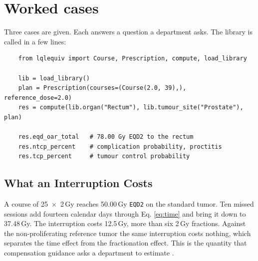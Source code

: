 \documentclass[preprint,12pt,number]{elsarticle}
\begin{document}
\section{Worked cases} \label{sec:examples}
Three cases are given. Each answers a question a department asks. The library is called in a few lines:
    \begin{verbatim}
    from lqlequiv import Course, Prescription, compute, load_library

    lib = load_library()
    plan = Prescription(courses=(Course(2.0, 39),), reference_dose=2.0)
    res = compute(lib.organ("Rectum"), lib.tumour_site("Prostate"), plan)

    res.eqd_oar_total   # 78.00 Gy EQD2 to the rectum
    res.ntcp_percent    # complication probability, proctitis
    res.tcp_percent     # tumour control probability
    \end{verbatim}

\subsection{What an Interruption Costs}
A course of 25~$\times$~2\,Gy reaches 50.00\,Gy \texttt{EQD2} on the standard tumor. Ten missed sessions add fourteen calendar days through Eq. \eqref{eq:time} and bring it down to 37.48\,Gy. The interruption costs 12.5\,Gy, more than six 2\,Gy fractions. Against the non-proliferating reference tumor the same interruption costs nothing, which separates the time effect from the fractionation effect. This is the quantity that compensation guidance asks a department to estimate \cite{rcr2019,jones2020,dale2024}.
\end{document}

